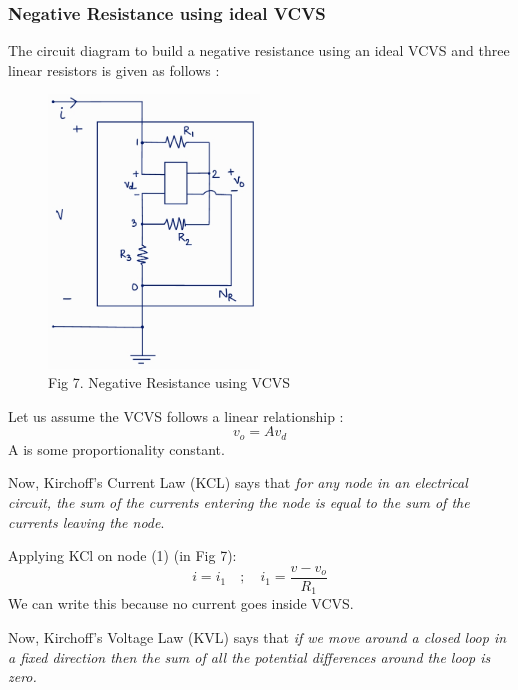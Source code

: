 \documentclass[12pt]{article}
\begin{document}
\subsubsection{Negative Resistance using ideal VCVS}
The circuit diagram to build a negative resistance using an ideal VCVS and three linear resistors is given as follows :
\begin{figure}[H]
	\centering
	\includegraphics[width=0.5\textwidth]{Images/fig7_Nr with vcvs.png}
	\caption{Fig 7. Negative Resistance using VCVS}
\end{figure}
Let us assume the VCVS follows a linear relationship :
\begin{equation}
	v_o=Av_d \label{eq:8}
\end{equation}
A is some proportionality constant. \linebreak

Now, Kirchoff's Current Law (KCL) says that \textit{for any node in an electrical circuit, the sum of the currents entering the node is equal to the sum of the currents leaving the node}. \linebreak

Applying KCl on node (1) (in Fig 7):
\begin{equation}
	i=i_1 \quad ; \quad  i_1=\dfrac{v-v_o}{R_1} \label{eq:9}
\end{equation}
We can write this because no current goes inside VCVS.\linebreak

Now, Kirchoff's Voltage Law (KVL) says that \textit{if we move around a closed loop in a fixed direction then the sum of all the potential differences around the loop is zero.} \linebreak
\end{document}
